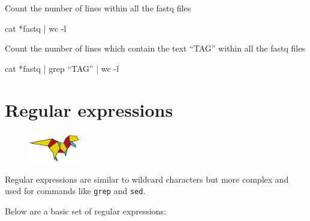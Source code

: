 \documentclass[
  letterpaper,
  DIV=11,
  numbers=noendperiod]{scrreprt}
\newenvironment{Shaded}{\begin{snugshade}}{\end{snugshade}}
\newcommand{\AttributeTok}[1]{\textcolor[rgb]{0.40,0.45,0.13}{#1}}
\newcommand{\FunctionTok}[1]{\textcolor[rgb]{0.28,0.35,0.67}{#1}}
\newcommand{\KeywordTok}[1]{\textcolor[rgb]{0.00,0.23,0.31}{#1}}
\newcommand{\NormalTok}[1]{\textcolor[rgb]{0.00,0.23,0.31}{#1}}
\newcommand{\PreprocessorTok}[1]{\textcolor[rgb]{0.68,0.00,0.00}{#1}}
\begin{document}
Count the number of lines within all the fastq files

\begin{Shaded}
\begin{Highlighting}[]
\FunctionTok{cat} \PreprocessorTok{*}\NormalTok{fastq }\KeywordTok{|} \FunctionTok{wc} \AttributeTok{{-}l}
\end{Highlighting}
\end{Shaded}

Count the number of lines which contain the text ``TAG'' within all the
fastq files

\begin{Shaded}
\begin{Highlighting}[]
\FunctionTok{cat} \PreprocessorTok{*}\NormalTok{fastq }\KeywordTok{|} \FunctionTok{grep}\NormalTok{ “TAG” }\KeywordTok{|} \FunctionTok{wc} \AttributeTok{{-}l}
\end{Highlighting}
\end{Shaded}

\hypertarget{regular-expressions}{%
\section{Regular expressions}\label{regular-expressions}}

\begin{figure}

{\centering \includegraphics[width=0.2\textwidth,height=\textheight]{figures/trex.png}

}

\end{figure}

Regular expressions are similar to wildcard characters but more complex
and used for commands like \texttt{grep} and \texttt{sed}.

Below are a basic set of regular expressions:
\end{document}
